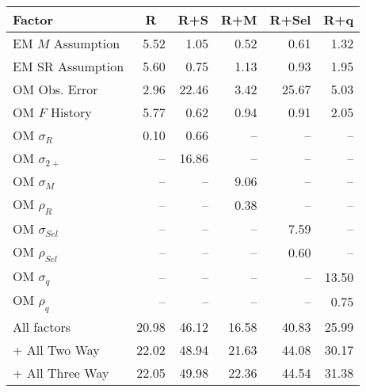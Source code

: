 \begin{center}
\begin{tabular}{lrrrrr}
\hline\hline
\multicolumn{1}{l}{Factor}&\multicolumn{1}{c}{R}&\multicolumn{1}{c}{R+S}&\multicolumn{1}{c}{R+M}&\multicolumn{1}{c}{R+Sel}&\multicolumn{1}{c}{R+q}\tabularnewline
\hline
EM $M$ Assumption& 5.52& 1.05& 0.52& 0.61& 1.32\tabularnewline
EM SR Assumption& 5.60& 0.75& 1.13& 0.93& 1.95\tabularnewline
OM Obs. Error& 2.96&22.46& 3.42&25.67& 5.03\tabularnewline
OM $F$ History& 5.77& 0.62& 0.94& 0.91& 2.05\tabularnewline
OM $\sigma_R$& 0.10& 0.66&--&--&--\tabularnewline
OM $\sigma_{2+}$ &--&16.86&--&--&--\tabularnewline
OM $\sigma_M$&--&--& 9.06&--&--\tabularnewline
OM $\rho_R$&--&--& 0.38&--&--\tabularnewline
OM $\sigma_{Sel}$&--&--&--& 7.59&--\tabularnewline
OM $\rho_{Sel}$&--&--&--& 0.60&--\tabularnewline
OM $\sigma_q$&--&--&--&--&13.50\tabularnewline
OM $\rho_q$&--&--&--&--& 0.75\tabularnewline
All factors&20.98&46.12&16.58&40.83&25.99\tabularnewline
+ All Two Way&22.02&48.94&21.63&44.08&30.17\tabularnewline
+ All Three Way&22.05&49.98&22.36&44.54&31.38\tabularnewline
\hline
\end{tabular}\end{center}
